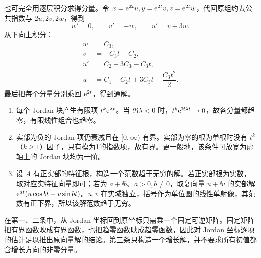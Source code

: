 也可完全用逐层积分求得分量。令 $x=\mathrm e^{2t}u,y=\mathrm e^{2t}v,z=\mathrm e^{2t}w$，代回原组约去公共指数与 $2u,2v,2w$，得到
\[
w'=0,\qquad v'=-w,\qquad u'=v+3w.
\]
从下向上积分：
\[
\begin{aligned}
w&=C_3,\\
v&=-C_3t+C_2,\\
u'&=C_2+3C_3-C_3t,\\
u&=C_1+C_2t+3C_3t-\dfrac{C_3t^2}{2}.
\end{aligned}
\]
最后把每个分量分别乘回 $\mathrm e^{2t}$，得到通解。
\begin{enumerate}
\item 每个 Jordan 块产生有限项 $t^k\mathrm e^{\lambda t}$。当 $\Re\lambda<0$ 时，$t^k\mathrm e^{\Re\lambda t}\to0$，故各分量都趋零，有限线性组合也趋零。
\item 实部为负的 Jordan 项仍衰减且在 $[0,\infty)$ 有界。实部为零的根为单根时没有 $t^k$（$k\ge1$）因子，只有模为1的指数项，故有界。更一般地，该条件可放宽为虚轴上的 Jordan 块均为一阶。
\item 设 $A$ 有正实部的特征根，构造一个范数趋于无穷的解。若正实部根为实数，取对应实特征向量即可；若为 $a+\ii b$、$a>0,b\ne0$，取复向量 $u+\ii v$ 的实部解 $\mathrm e^{at}(u\cos bt-v\sin bt)$。$u,v$ 在实域独立，括号作为单位圆的线性单射像，其范数有正下界，所以该解范数趋于无穷。
\end{enumerate}
在第一、二条中，从 Jordan 坐标回到原坐标只需乘一个固定可逆矩阵。固定矩阵把有界函数映成有界函数，也把趋零函数映成趋零函数，因此对 Jordan 坐标逐项的估计足以推出原向量解的结论。第三条只构造一个增长解，并不要求所有初值都含增长方向的非零分量。

